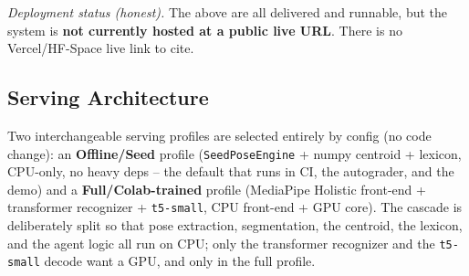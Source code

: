 \documentclass[12pt,a4paper]{article}
\begin{document}
\noindent\textit{Deployment status (honest).} The above are all delivered and runnable, but the system is \textbf{not currently hosted at a public live URL}. There is no Vercel/HF-Space live link to cite.

\subsection{Serving Architecture}

Two interchangeable serving profiles are selected entirely by config (no code change): an \textbf{Offline/Seed} profile (\texttt{SeedPoseEngine} + numpy centroid + lexicon, CPU-only, no heavy deps -- the default that runs in CI, the autograder, and the demo) and a \textbf{Full/Colab-trained} profile (MediaPipe Holistic front-end + transformer recognizer + \texttt{t5-small}, CPU front-end + GPU core). The cascade is deliberately split so that pose extraction, segmentation, the centroid, the lexicon, and the agent logic all run on CPU; only the transformer recognizer and the \texttt{t5-small} decode want a GPU, and only in the full profile.
\end{document}
